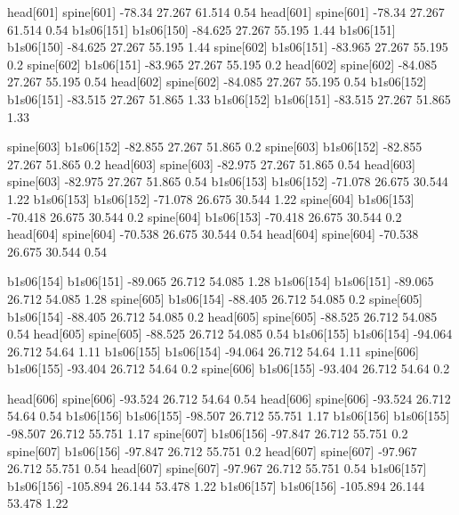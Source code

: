 head[601]    spine[601]    -78.34    27.267    61.514    0.54
head[601]    spine[601]    -78.34    27.267    61.514    0.54
b1s06[151]    b1s06[150]    -84.625    27.267    55.195    1.44
b1s06[151]    b1s06[150]    -84.625    27.267    55.195    1.44
spine[602]    b1s06[151]    -83.965    27.267    55.195    0.2
spine[602]    b1s06[151]    -83.965    27.267    55.195    0.2
head[602]    spine[602]    -84.085    27.267    55.195    0.54
head[602]    spine[602]    -84.085    27.267    55.195    0.54
b1s06[152]    b1s06[151]    -83.515    27.267    51.865    1.33
b1s06[152]    b1s06[151]    -83.515    27.267    51.865    1.33


spine[603]    b1s06[152]    -82.855    27.267    51.865    0.2
spine[603]    b1s06[152]    -82.855    27.267    51.865    0.2
head[603]    spine[603]    -82.975    27.267    51.865    0.54
head[603]    spine[603]    -82.975    27.267    51.865    0.54
b1s06[153]    b1s06[152]    -71.078    26.675    30.544    1.22
b1s06[153]    b1s06[152]    -71.078    26.675    30.544    1.22
spine[604]    b1s06[153]    -70.418    26.675    30.544    0.2
spine[604]    b1s06[153]    -70.418    26.675    30.544    0.2
head[604]    spine[604]    -70.538    26.675    30.544    0.54
head[604]    spine[604]    -70.538    26.675    30.544    0.54


b1s06[154]    b1s06[151]    -89.065    26.712    54.085    1.28
b1s06[154]    b1s06[151]    -89.065    26.712    54.085    1.28
spine[605]    b1s06[154]    -88.405    26.712    54.085    0.2
spine[605]    b1s06[154]    -88.405    26.712    54.085    0.2
head[605]    spine[605]    -88.525    26.712    54.085    0.54
head[605]    spine[605]    -88.525    26.712    54.085    0.54
b1s06[155]    b1s06[154]    -94.064    26.712    54.64    1.11
b1s06[155]    b1s06[154]    -94.064    26.712    54.64    1.11
spine[606]    b1s06[155]    -93.404    26.712    54.64    0.2
spine[606]    b1s06[155]    -93.404    26.712    54.64    0.2


head[606]    spine[606]    -93.524    26.712    54.64    0.54
head[606]    spine[606]    -93.524    26.712    54.64    0.54
b1s06[156]    b1s06[155]    -98.507    26.712    55.751    1.17
b1s06[156]    b1s06[155]    -98.507    26.712    55.751    1.17
spine[607]    b1s06[156]    -97.847    26.712    55.751    0.2
spine[607]    b1s06[156]    -97.847    26.712    55.751    0.2
head[607]    spine[607]    -97.967    26.712    55.751    0.54
head[607]    spine[607]    -97.967    26.712    55.751    0.54
b1s06[157]    b1s06[156]    -105.894    26.144    53.478    1.22
b1s06[157]    b1s06[156]    -105.894    26.144    53.478    1.22


